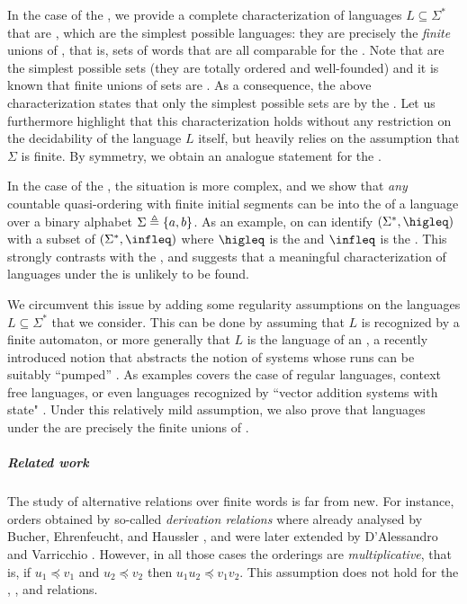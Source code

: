 In the case of the , we provide a complete characterization
of languages $L \subseteq \Sigma^*$ that are , which are
the simplest possible languages: they are precisely the \emph{finite} unions of
, that is, sets of words that are all comparable for the
. Note that  are the simplest possible
 sets (they are totally ordered and well-founded) and it
is known that finite unions of  sets are
. As a consequence, the above characterization states
that only the simplest possible  sets are
 by the . Let us furthermore
highlight that this characterization holds without any restriction on the
decidability of the language $L$ itself, but heavily relies on the assumption
that $\Sigma$ is finite. By symmetry, we obtain an analogue statement for the
.

In the case of the , the situation is more complex, and we
show that \emph{any} countable quasi-ordering with finite initial segments can
be  into the  of a language over a binary
alphabet $\Sigma \triangleq \{ a,b \}$. As an example, on can identify
$(\Sigma^*, \higleq)$ with a subset of $(\Sigma^*, \infleq)$ where $\higleq$ is
the  and $\infleq$ is the . This
strongly contrasts with the , and suggests that a
meaningful characterization of  languages under the
 is unlikely to be found. 

We circumvent this issue by adding some regularity assumptions on the languages
$L \subseteq \Sigma^*$ that we consider. This can be done by assuming that $L$
is recognized by a finite automaton, or more generally that $L$ is the language
of an , a recently introduced notion that abstracts the
notion of systems whose runs can be suitably ``pumped'' \cite{ASZZ24}. As
examples  covers the case of regular languages,
context free languages, or even languages recognized by ``vector addition
systems with state" \cite{ASZZ24}. Under this relatively mild assumption, we
also prove that  languages under the 
are precisely the finite unions of .

\subparagraph{Related work} The study of alternative 
relations over finite words is far from new. For instance, orders obtained by
so-called \emph{derivation relations} where already analysed by Bucher,
Ehrenfeucht, and Haussler \cite{BUEUD85}, and were later extended by
D'Alessandro and Varricchio \cite{ALVA03,ALVA06}. However, in all those cases
the orderings are \emph{multiplicative}, that is, if $u_1 \preceq v_1$ and $u_2
\preceq v_2$ then $u_1u_2 \preceq v_1v_2$. This assumption does not hold for
the , , and  relations.

